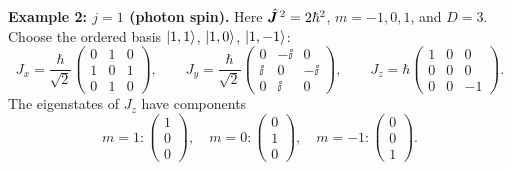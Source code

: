 \textbf{Example 2: $j=1$ (photon spin).} Here $\hat{\bm{J}}^{\,2}=2\hbar^2$, $m=-1,0,1$, and $D=3$. Choose the ordered basis $\left|1,1\right\rangle$, $\left|1,0\right\rangle$, $\left|1,-1\right\rangle$:
\begin{equation}
J_x=\frac\hbar{\sqrt2}\begin{pmatrix}0&1&0\\1&0&1\\0&1&0\end{pmatrix},\qquad
J_y=\frac\hbar{\sqrt2}\begin{pmatrix}0&-\ii&0\\\ii&0&-\ii\\0&\ii&0\end{pmatrix},\qquad
J_z=\hbar\begin{pmatrix}1&0&0\\0&0&0\\0&0&-1\end{pmatrix}.
\end{equation}
The eigenstates of $J_z$ have components
\begin{equation}
m=1:\begin{pmatrix}1\\0\\0\end{pmatrix},\quad
m=0:\begin{pmatrix}0\\1\\0\end{pmatrix},\quad
m=-1:\begin{pmatrix}0\\0\\1\end{pmatrix}.
\end{equation}

